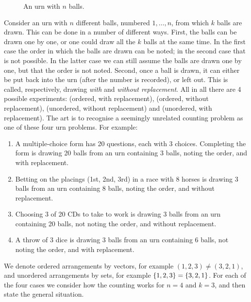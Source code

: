 \begin{figure}[H]
\centering
{}
\caption{An urn with $n$ balls.}
\label{fig:urn}
\end{figure}

Consider an urn with $n$ different balls, numbered $1, \ldots, n$, from which $k$ balls are drawn. This can be done in a number of different ways. First, the balls can be drawn one by one, or one could draw all the $k$ balls at the same time. In the first case the order in which the balls are drawn can be noted; in the second case that is not possible. In the latter case we can still assume the balls are drawn one by one, but that the order is not noted. Second, once a ball is drawn, it can either be put back into the urn (after the number is recorded), or left out. This is called, respectively, drawing \emph{with} and \emph{without replacement}. All in all there are 4 possible experiments: (ordered, with replacement), (ordered, without replacement), (unordered, without replacement) and (unordered, with replacement). The art is to recognise a seemingly unrelated counting problem as one of these four urn problems. For example:
\begin{enumerate}
  \item A multiple-choice form has 20 questions, each with 3 choices. Completing the form is drawing 20 balls from an urn containing 3 balls, noting the order, and with replacement.
  \item Betting on the placings (1st, 2nd, 3rd) in a race with 8 horses is drawing 3 balls from an urn containing 8 balls, noting the order, and without replacement.
  \item Choosing 3 of 20 CDs to take to work is drawing 3 balls from an urn containing 20 balls, not noting the order, and without replacement.
  \item A throw of 3 dice is drawing 3 balls from an urn containing 6 balls, not noting the order, and with replacement.
\end{enumerate}
We denote ordered arrangements by vectors, for example $(1, 2, 3) \ne (3, 2, 1)$, and unordered arrangements by sets, for example $\left\{ 1, 2, 3 \right\} = \left\{ 3, 2, 1 \right\}$. For each of the four cases we consider how the counting works for $n = 4$ and $k = 3$, and then state the general situation.

